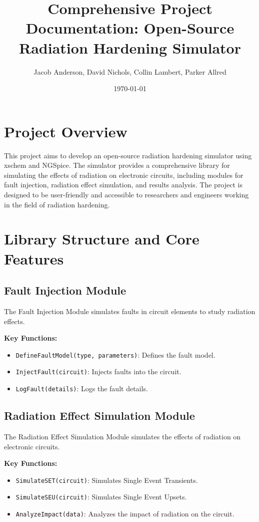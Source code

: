 \documentclass[12pt]{article}
\title{Comprehensive Project Documentation: Open-Source Radiation Hardening Simulator}
\author{Jacob Anderson, David Nichols, Collin Lambert, Parker Allred}
\date{\today}
\begin{document}
\maketitle
\tableofcontents
\newpage

\section{Project Overview}
This project aims to develop an open-source radiation hardening simulator using xschem and NGSpice. The simulator provides a comprehensive library for simulating the effects of radiation on electronic circuits, including modules for fault injection, radiation effect simulation, and results analysis. The project is designed to be user-friendly and accessible to researchers and engineers working in the field of radiation hardening.

\section{Library Structure and Core Features}
\subsection{Fault Injection Module}
The Fault Injection Module simulates faults in circuit elements to study radiation effects.

\textbf{Key Functions:}
\begin{itemize}
    \item \texttt{DefineFaultModel(type, parameters)}: Defines the fault model.
    \item \texttt{InjectFault(circuit)}: Injects faults into the circuit.
    \item \texttt{LogFault(details)}: Logs the fault details.
\end{itemize}

\subsection{Radiation Effect Simulation Module}
The Radiation Effect Simulation Module simulates the effects of radiation on electronic circuits.

\textbf{Key Functions:}
\begin{itemize}
    \item \texttt{SimulateSET(circuit)}: Simulates Single Event Transients.
    \item \texttt{SimulateSEU(circuit)}: Simulates Single Event Upsets.
    \item \texttt{AnalyzeImpact(data)}: Analyzes the impact of radiation on the circuit.
\end{itemize}
\end{document}
